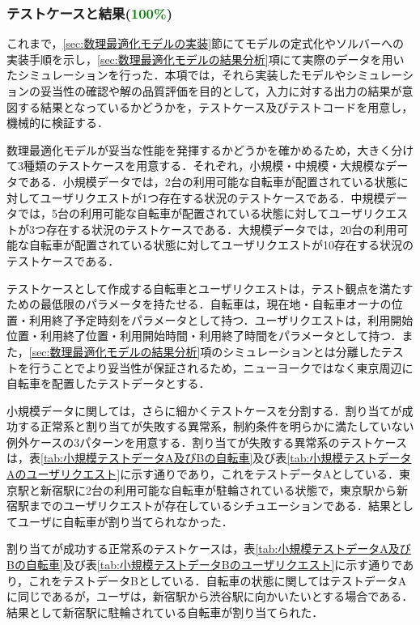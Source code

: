       \subsubsection{テストケースと結果(\textcolor{green}{100\%})}
        \label{sec:テストケースと結果}
          \par これまで，\ref{sec:数理最適化モデルの実装}節にてモデルの定式化やソルバーへの実装手順を示し，\ref{sec:数理最適化モデルの結果分析}項にて実際のデータを用いたシミュレーションを行った．本項では，それら実装したモデルやシミュレーションの妥当性の確認や解の品質評価を目的として，入力に対する出力の結果が意図する結果となっているかどうかを，テストケース及びテストコードを用意し，機械的に検証する．
          \par 数理最適化モデルが妥当な性能を発揮するかどうかを確かめるため，大きく分けて3種類のテストケースを用意する．それぞれ，小規模・中規模・大規模なデータである．小規模データでは，2台の利用可能な自転車が配置されている状態に対してユーザリクエストが1つ存在する状況のテストケースである．中規模データでは，5台の利用可能な自転車が配置されている状態に対してユーザリクエストが3つ存在する状況のテストケースである．大規模データでは，20台の利用可能な自転車が配置されている状態に対してユーザリクエストが10存在する状況のテストケースである．
          \par テストケースとして作成する自転車とユーザリクエストは，テスト観点を満たすための最低限のパラメータを持たせる．自転車は，現在地・自転車オーナの位置・利用終了予定時刻をパラメータとして持つ．ユーザリクエストは，利用開始位置・利用終了位置・利用開始時間・利用終了時間をパラメータとして持つ．また，\ref{sec:数理最適化モデルの結果分析}項のシミュレーションとは分離したテストを行うことでより妥当性が保証されるため，ニューヨークではなく東京周辺に自転車を配置したテストデータとする．
          \par 小規模データに関しては，さらに細かくテストケースを分割する．割り当てが成功する正常系と割り当てが失敗する異常系，制約条件を明らかに満たしていない例外ケースの3パターンを用意する．割り当てが失敗する異常系のテストケースは，表\ref{tab:小規模テストデータA及びBの自転車}及び表\ref{tab:小規模テストデータAのユーザリクエスト}に示す通りであり，これをテストデータAとしている．東京駅と新宿駅に2台の利用可能な自転車が駐輪されている状態で，東京駅から新宿駅までのユーザリクエストが存在しているシチュエーションである．結果としてユーザに自転車が割り当てられなかった．
          \par 割り当てが成功する正常系のテストケースは，表\ref{tab:小規模テストデータA及びBの自転車}及び表\ref{tab:小規模テストデータBのユーザリクエスト}に示す通りであり，これをテストデータBとしている．自転車の状態に関してはテストデータAに同じであるが，ユーザは，新宿駅から渋谷駅に向かいたいとする場合である．結果として新宿駅に駐輪されている自転車が割り当てられた．
